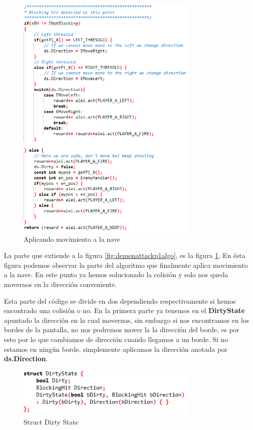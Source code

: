 \begin{figure}[h]
	\centering
	\includegraphics[width=0.79\textwidth]{Figures/damovement}
	\caption{Aplicando movimiento a la nave}
	\label{fig:damovement}
\end{figure}

La parte que extiende a la figura \ref{fig:demonattackp1algo}, es la figura \ref{fig:damovement}. En ésta figura podemos observar la parte del algoritmo que finalmente aplica movimiento a la nave. En este punto ya hemos solucionado la colisión y solo nos queda movernos en la dirección conveniente.

Esta parte del código se divide en dos dependiendo respectivamente si hemos encontrado una colisión o no. En la primera parte ya tenemos en el \textbf{DirtyState} apuntado la dirección en la cual movernos, sin embargo si nos encontramos en los bordes de la pantalla, no nos podremos mover la la dirección del borde, es por esto por lo que cambiamos de dirección cuando llegamos a un borde. Si no estamos en ningún borde, simplemente aplicamos la dirección anotada por \textbf{ds.Direction}.

\begin{figure}[h]
	\centering
	\includegraphics[width=0.79\textwidth]{Figures/structdirtystateda}
	\caption{Struct Dirty State}
	\label{fig:structdirtystateda}
\end{figure}


